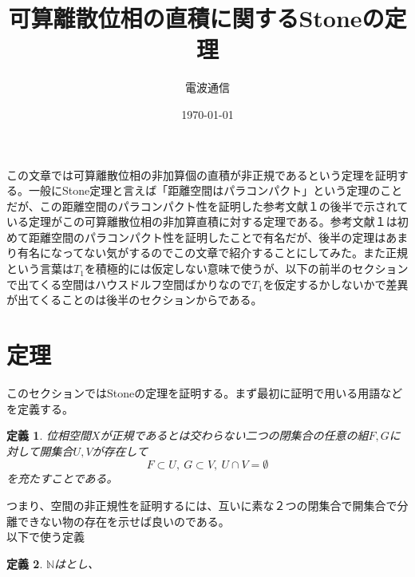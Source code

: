 \documentclass{jsarticle}
\title{可算離散位相の直積に関するStoneの定理}
\author{電波通信}
\date{\today}
\newtheorem{df}{定義}
\begin{document}
\maketitle
この文章では可算離散位相の非加算個の直積が非正規であるという定理を証明する。一般にStone定理と言えば「距離空間はパラコンパクト」という定理のことだが、この距離空間のパラコンパクト性を証明した参考文献１の後半で示されている定理がこの可算離散位相の非加算直積に対する定理である。参考文献１は初めて距離空間のパラコンパクト性を証明したことで有名だが、後半の定理はあまり有名になってない気がするのでこの文章で紹介することにしてみた。また正規という言葉は$T_1$を積極的には仮定しない意味で使うが、以下の前半のセクションで出てくる空間はハウスドルフ空間ばかりなので$T_1$を仮定するかしないかで差異が出てくることのは後半のセクションからである。
\section{定理}
このセクションではStoneの定理を証明する。まず最初に証明で用いる用語などを定義する。
\begin{df}
位相空間$X$が正規であるとは交わらない二つの閉集合の任意の組$F,G$に対して開集合$U,V$が存在して
\[
F\subset U,\ G\subset V,\ U\cap V =\emptyset
\]を充たすことである。
\end{df}つまり、空間の非正規性を証明するには、互いに素な２つの閉集合で開集合で分離できない物の存在を示せば良いのである。\\ 
以下で使う定義
\begin{df}
$\mathbb{N}$はとし、
\end{df}
\end{document}
